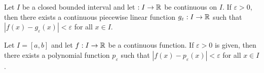 \begin{theorem}
	Let $I$ be a closed bounded interval and let $:I \rightarrow \mathbb{R}$ be continuous on $I$. If $\varepsilon > 0$, then there exists a continuous piecewise linear function $g_\varepsilon : I \rightarrow \mathbb{R}$ such that $|f(x) - g_\varepsilon (x)| < \varepsilon$ for all $ x \in I$.
\end{theorem}

\begin{theorem}
	Let $I=[a,b]$ and let $f: I \rightarrow \mathbb{R}$ be a continuous function. If $\varepsilon > 0$ is given, then there exists a polynomial function $p_\varepsilon$ such that $|f(x) - p_\varepsilon (x)| < \varepsilon$ for all $ x \in I$.
\end{theorem}
